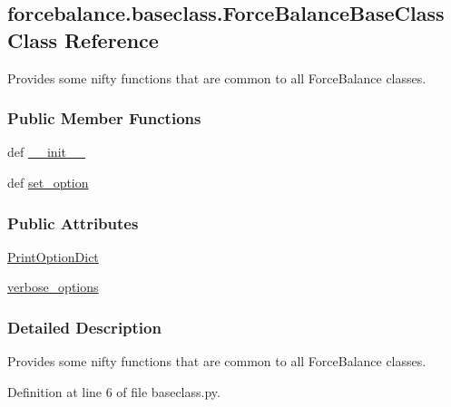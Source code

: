 \hypertarget{classforcebalance_1_1baseclass_1_1ForceBalanceBaseClass}{\subsection{forcebalance.\-baseclass.\-Force\-Balance\-Base\-Class \-Class \-Reference}
\label{classforcebalance_1_1baseclass_1_1ForceBalanceBaseClass}
}


\-Provides some nifty functions that are common to all \-Force\-Balance classes.  


\subsubsection*{\-Public \-Member \-Functions}
\begin{DoxyCompactItemize}
\item 
def \hyperlink{classforcebalance_1_1baseclass_1_1ForceBalanceBaseClass_ae45042977c2803fce9830ce2196453a7}{\-\_\-\-\_\-init\-\_\-\-\_\-}
\item 
def \hyperlink{classforcebalance_1_1baseclass_1_1ForceBalanceBaseClass_abaaf4d99b043d41f02fabc41db59252b}{set\-\_\-option}
\end{DoxyCompactItemize}
\subsubsection*{\-Public \-Attributes}
\begin{DoxyCompactItemize}
\item 
\hyperlink{classforcebalance_1_1baseclass_1_1ForceBalanceBaseClass_a0e0a596edaae3bf9abc4e355cc03c8a5}{\-Print\-Option\-Dict}
\item 
\hyperlink{classforcebalance_1_1baseclass_1_1ForceBalanceBaseClass_a276e1c27d7e157c7ae64800367851f1f}{verbose\-\_\-options}
\end{DoxyCompactItemize}


\subsubsection{\-Detailed \-Description}
\-Provides some nifty functions that are common to all \-Force\-Balance classes. 



\-Definition at line 6 of file baseclass.\-py.



